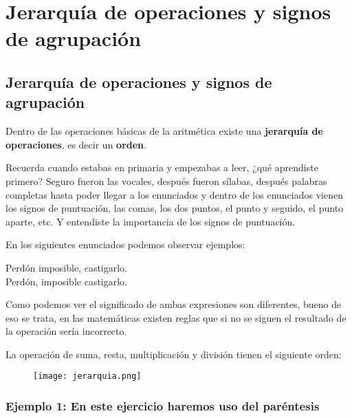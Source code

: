 \thispagestyle{plain}
\section{Jerarqu\'ia de operaciones y signos de agrupaci\'on}

\subsection{Jerarqu\'ia de operaciones y signos de agrupaci\'on}
Dentro de las operaciones básicas de la aritmética existe una \textbf{jerarquía de operaciones}, es decir un
\textbf{orden}.

Recuerda cuando estabas en primaria y empezabas a leer, ¿qué aprendiste primero? Seguro fueron las vocales,
después fueron sílabas, después palabras completas hasta poder llegar a los enunciados y dentro de los enunciados
vienen los signos de puntuación, las comas, los dos puntos, el punto y seguido, el punto aparte, etc.
Y entendiste la importancia de los signos de puntuación.

En los siguientes enunciados podemos observar ejemplos:
\begin{center}
    \begin{minipage}{0.4\textwidth}
        \begin{bA}
            Perdón imposible, castigarlo.\\
            Perdón, imposible castigarlo.
        \end{bA}
    \end{minipage}
\end{center}

Como podemos ver el significado de ambas expresiones son diferentes, bueno de eso se trata, en las matemáticas
existen reglas que si no se siguen el resultado de la operación sería incorrecto.

La operación de suma, resta, multiplicación y división tienen el siguiente orden:
\begin{figure}[H]
    \centering
    \texttt{[image: jerarquia.png]}
\end{figure}

\subsubsection{Ejemplo 1: En este ejercicio haremos uso del paréntesis}

